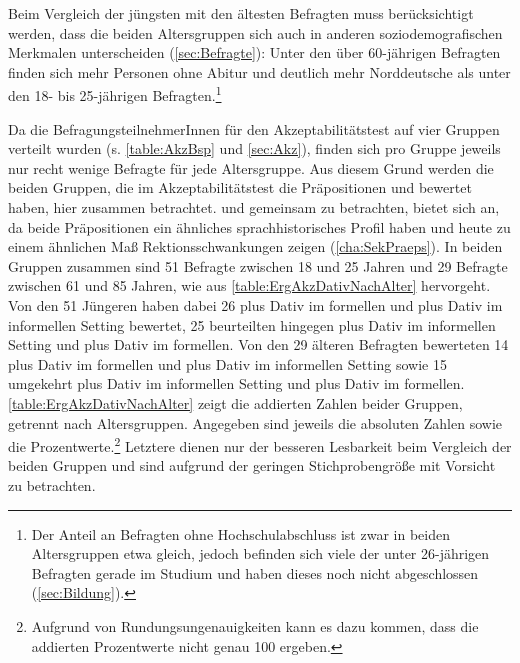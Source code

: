 Beim Vergleich der jüngsten mit den ältesten Befragten muss berücksichtigt werden, dass die beiden Altersgruppen sich auch in anderen soziodemografischen Merkmalen unterscheiden (\autoref{sec:Befragte}):
Unter den über 60-jährigen Befragten finden sich mehr Personen ohne Abitur und deutlich mehr Norddeutsche als unter den 18- bis 25-jährigen Befragten.\footnote{Der Anteil an Befragten ohne Hochschulabschluss ist zwar in beiden Altersgruppen etwa gleich, jedoch befinden sich viele der unter 26-jährigen Befragten gerade im Studium und haben dieses noch nicht abgeschlossen (\autoref{sec:Bildung}).} 

Da die BefragungsteilnehmerInnen für den Akzeptabilitätstest auf vier Gruppen verteilt wurden (s. \autoref{table:AkzBsp} und \autoref{sec:Akz}), finden sich pro Gruppe jeweils nur recht wenige Befragte für jede Altersgruppe. 
Aus diesem Grund werden die beiden Gruppen, die im Akzeptabilitätstest die Präpositionen \wegen{} und \waehrend{} bewertet haben, hier zusammen betrachtet. 
 und \waehrend{} gemeinsam zu betrachten, bietet sich an, da beide Präpositionen ein ähnliches sprachhistorisches Profil haben und heute zu einem ähnlichen Maß Rektionsschwankungen zeigen (\autoref{cha:SekPraeps}). 
In beiden Gruppen zusammen sind 51 Befragte zwischen 18 und 25 Jahren und 29 Befragte zwischen 61 und 85 Jahren, wie aus \autoref{table:ErgAkzDativNachAlter} hervorgeht. 
Von den 51 Jüngeren haben dabei 26 \wegen{} plus Dativ im formellen und \waehrend{} plus Dativ im informellen Setting bewertet, 25 beurteilten hingegen \wegen{} plus Dativ im informellen Setting und \waehrend{} plus Dativ im formellen. 
Von den 29 älteren Befragten bewerteten 14 \wegen{} plus Dativ im formellen und \waehrend{} plus Dativ im informellen Setting sowie 15 umgekehrt \wegen{} plus Dativ im informellen Setting und \waehrend{} plus Dativ im formellen.
\autoref{table:ErgAkzDativNachAlter} zeigt die addierten Zahlen beider Gruppen, getrennt nach Altersgruppen. 
Angegeben sind jeweils die absoluten Zahlen sowie die Prozentwerte.\footnote{Aufgrund von Rundungsungenauigkeiten kann es dazu kommen, dass die addierten Prozentwerte nicht genau 100 ergeben.}
Letztere dienen nur der besseren Lesbarkeit beim Vergleich der beiden Gruppen und sind aufgrund der geringen Stichprobengröße mit Vorsicht zu betrachten. 
